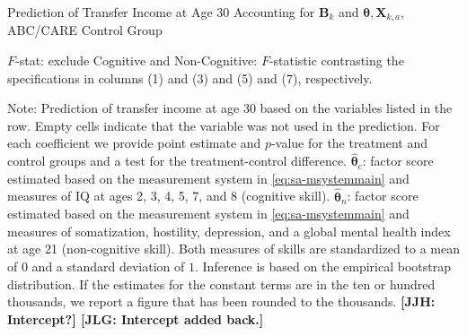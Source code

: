 \begin{table}
\begin{threeparttable}
\caption{Prediction of Transfer Income at Age 30 Accounting for $\bm{B}_k$ and $\bm{\theta}, \bm{X}_{k,a}$, ABC/CARE Control Group}
\label{table:endoginc}
\centering
\footnotesize

\begin{tablenotes}
\footnotesize
\item $F$-stat: exclude Cognitive and Non-Cognitive: $F$-statistic contrasting the specifications in columns (1) and (3) and (5) and (7), respectively.\\
\item Note: Prediction of transfer income at age 30 based on the variables listed in the row. Empty cells indicate that the variable was not used in the prediction. For each coefficient we provide point estimate and $p$-value for the treatment and control groups and a test for the treatment-control difference. $\hat{\bm{\theta}}_{c}$: factor score estimated based on the measurement system in \eqref{eq:sa-msystemmain} and measures of IQ at ages 2, 3, 4, 5, 7, and 8 (cognitive skill). $\hat{\bm{\theta}}_{n}$: factor score estimated based on the measurement system in \eqref{eq:sa-msystemmain} and measures of somatization, hostility, depression, and a global mental health index at age 21 (non-cognitive skill). Both measures of skills are standardized to a mean of $0$ and a standard deviation of $1$. Inference is based on the empirical bootstrap distribution. If the estimates for the constant terms are in the ten or hundred thousands, we report a figure that has been rounded to the thousands. \textbf{[JJH: Intercept?] [JLG: Intercept added back.]}
\end{tablenotes}
\end{threeparttable}
\end{table}

